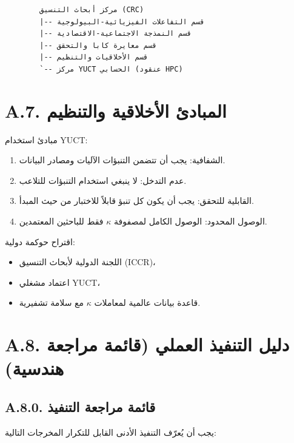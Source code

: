 \documentclass[13pt,a4paper]{article}
\begin{document}
	\begin{lstlisting}
		مركز أبحاث التنسيق (CRC)
		|-- قسم التفاعلات الفيزيائية-البيولوجية
		|-- قسم النمذجة الاجتماعية-الاقتصادية
		|-- قسم معايرة كابا والتحقق
		|-- قسم الأخلاقيات والتنظيم
		`-- مركز YUCT الحسابي (عنقود HPC)
	\end{lstlisting}
	
	\section*{A.7. المبادئ الأخلاقية والتنظيم}
	
	مبادئ استخدام YUCT:
	\begin{enumerate}[leftmargin=*]
		\item الشفافية: يجب أن تتضمن التنبؤات الآليات ومصادر البيانات.
		\item عدم التدخل: لا ينبغي استخدام التنبؤات للتلاعب.
		\item القابلية للتحقق: يجب أن يكون كل تنبؤ قابلاً للاختبار من حيث المبدأ.
		\item الوصول المحدود: الوصول الكامل لمصفوفة $\kappa$ فقط للباحثين المعتمدين.
	\end{enumerate}
	
	اقتراح حوكمة دولية:
	\begin{itemize}[leftmargin=*]
		\item اللجنة الدولية لأبحاث التنسيق (ICCR)،
		\item اعتماد مشغلي YUCT،
		\item قاعدة بيانات عالمية لمعاملات $\kappa$ مع سلامة تشفيرية.
	\end{itemize}
	
	\section*{A.8. دليل التنفيذ العملي (قائمة مراجعة هندسية)}
	
	\subsection*{A.8.0. قائمة مراجعة التنفيذ}
	يجب أن يُعرّف التنفيذ الأدنى القابل للتكرار المخرجات التالية:
	
\end{document}

